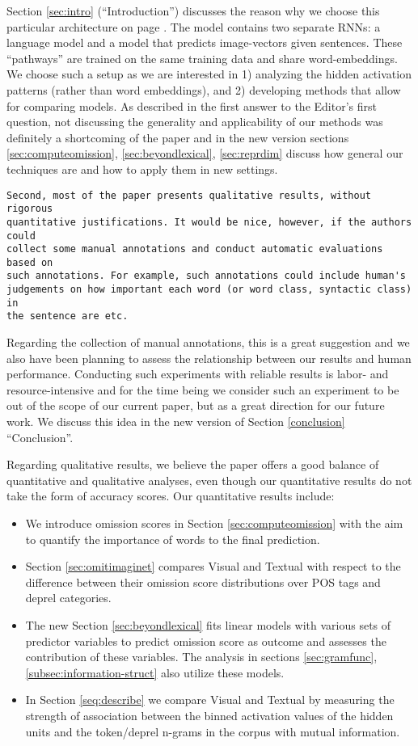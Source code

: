 \documentclass{article}
\begin{document}
Section \ref{sec:intro} (``Introduction'')
discusses the reason why we choose this particular architecture
on page \pageref{explainimaginet}. The model contains 
two separate RNNs: a language model and a
model that predicts image-vectors given sentences. 
These ``pathways'' are trained on the same training data and 
share word-embeddings. We choose such a setup as we
are interested in 1) analyzing the hidden activation patterns 
(rather than word embeddings), and 2) developing methods that allow for comparing models.
As described in the first answer to the 
Editor's first question, not discussing the generality and
applicability of our methods was definitely a shortcoming of the paper and
in the new version sections \ref{sec:computeomission},
\ref{sec:beyondlexical}, \ref{sec:reprdim} discuss
how general our techniques are and how to apply them in new settings.

\begin{verbatim}
Second, most of the paper presents qualitative results, without rigorous
quantitative justifications. It would be nice, however, if the authors could
collect some manual annotations and conduct automatic evaluations based on
such annotations. For example, such annotations could include human's
judgements on how important each word (or word class, syntactic class) in
the sentence are etc.
\end{verbatim}
Regarding the collection of manual annotations, this is a great
suggestion and we also have been planning 
to assess the relationship between our results and human 
performance. Conducting such experiments with 
reliable results is labor- and resource-intensive and for the time 
being we consider such an experiment to be out of the scope of our current
paper, but as a great direction for our future work. 
We discuss this idea in the new version of Section 
\ref{conclusion} ``Conclusion''. 

Regarding qualitative results, we believe the paper offers a good
balance of quantitative and qualitative analyses, even though our
quantitative results do not take the form of accuracy scores. Our
quantitative results include:
\begin{itemize}
 \item We introduce omission scores in Section \ref{sec:computeomission}
 with the aim to quantify the importance of words to 
 the final prediction.
 \item Section \ref{sec:omitimaginet} compares {\sc Visual} and {\sc Textual} 
 with respect to the difference between their omission score distributions
 over POS tags and deprel categories.
 \item The new Section \ref{sec:beyondlexical} fits linear models with 
 various sets of predictor variables to predict omission score as outcome and
 assesses the contribution of these variables. 
 The analysis in sections \ref{sec:gramfunc}, 
 \ref{subsec:information-struct} also utilize these models.
 \item In Section \ref{seq:describe} we compare 
 {\sc Visual} and {\sc Textual}
 by measuring the strength of association between the 
 binned activation values
 of the hidden units and the token/deprel n-grams in the corpus with mutual
 information. 
\end{itemize}
\end{document}
